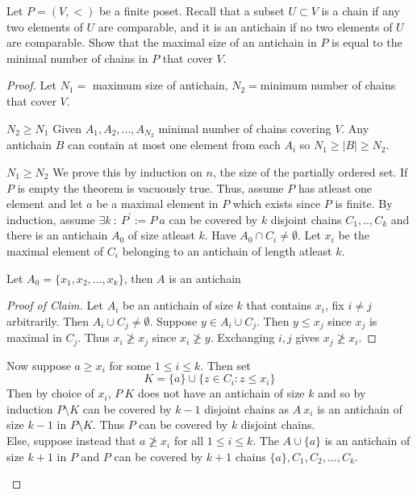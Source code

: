 \documentclass[a4paper]{article}
\begin{document}
	\begin{question}[Question 1]
	Let $P = (V, <)$ be a finite poset. Recall that a subset $U \subset V$ is a chain if any two elements of $U$ are comparable, and it is an antichain if no two elements of $U$ are comparable. Show that the maximal size of an antichain in $P$ is equal to the minimal number of chains in $P$ that cover $V$. 
	\end{question}
	\begin{proof}
	Let $N_1 = $ maximum size of antichain, $N_2 = $minimum number of chains that cover $V$.
	\begin{description}
	\item \underline{$N_2 \geq N_1$} Given $A_1, A_2, ..., A_{N_2}$ minimal number of chains covering $V$. Any antichain $B$ can contain at most one element from each $A_i$ so $N_1 \geq |B| \geq N_2$.
	\item \underline{$N_1 \geq N_2$} We prove this by induction on $n$, the size of the partially ordered set. If $P$ is empty the theorem is vacuously true. Thus, assume $P$ has atleast one element and let $a$ be a maximal element in $P$ which exists since $P$ is finite. By induction, assume $\exists k \ : \ P^{'} := P \ {a}$ can be covered by $k$ disjoint chains $C_1,..,C_k$ and there is an antichain $A_0$ of size atleast $k$. Have $A_0 \cap C_i \not = \emptyset$. Let $x_i$ be the maximal element of $C_i$ belonging to an antichain of length atleast $k$.\\
	\begin{remark}[Claim] Let $A_0 = \{x_1,x_2,...,x_k\}$, then $A$ is an antichain
	\begin{proof}[Proof of Claim]\renewcommand{\qedsymbol}{}
	Let $A_i$ be an antichain of size $k$ that contains $x_i$, fix $i \not = j$ arbitrarily. Then $A_i \cup C_j \not = \emptyset$. Suppose $y \in A_i \cup C_j$. Then $y \leq x_j$ since $x_j$ is maximal in $C_j$. Thus $x_i \not \geq x_j$ since $x_i \not \geq y$. Exchanging $i,j$ gives $x_j \not \geq x_i$.
	\end{proof}
	\end{remark}
	Now suppose $a \geq x_i$ for some $1 \leq i \leq k$. Then set
	\[K = \{a\} \cup \{z \in C_i : z \leq x_i\}\]
	Then by choice of $x_i$, $P \ K$ does not have an antichain of size $k$ and so by induction $P \setminus K$ can be covered by $k-1$ disjoint chains as $A \ {x_i}$ is an antichain of size $k-1$ in $P \setminus K$. Thus $P$ can be covered by $k$ disjoint chains.\\
	Else, suppose instead that $a \not \geq x_i$ for all $1 \leq i \leq k$. The $A \cup \{a\}$ is an antichain of size $k+1$ in $P$ and $P$ can be covered by $k+1$ chains $\{a\}, C_1, C_2,...,C_k$.
	\end{description}
	\end{proof}
	
\end{document}
